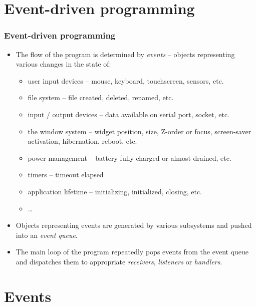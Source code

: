 \section{Event-driven programming}

\begin{frame}
  \frametitle{Event-driven programming}
  \footnotesize
  \begin{itemize}
    \item The flow of the program is determined by {\em events} -- objects
     representing various changes in the state of:
     \begin{itemize}
       \item user input devices -- mouse, keyboard, touchscreen, sensors, etc.
       \item file system -- file created, deleted, renamed, etc.
       \item input / output devices -- data available on serial port, socket, etc.
       \item the window system -- widget position, size, Z-order or focus,
         screen-saver activation, hibernation, reboot, etc.
       \item power management -- battery fully charged or almost drained, etc.
       \item timers -- timeout elapsed
       \item application lifetime -- initializing, initialized, closing, etc.
       \item \ldots
     \end{itemize}
    \item Objects representing events are generated by various subsystems and
      pushed into an {\em event queue}.
    \item The main loop of the program repeatedly pops events from the event queue
      and dispatches them to appropriate {\em receivers}, {\em listeners} or
      {\em handlers}.
  \end{itemize}
\end{frame}

\section{Events}

